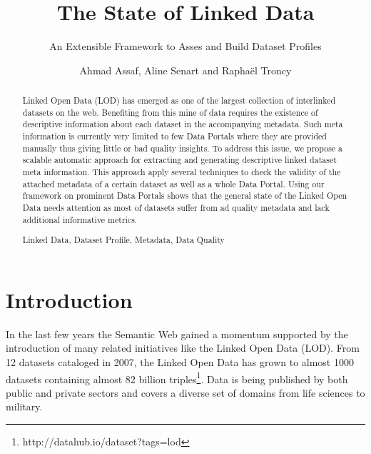 \documentclass[runningheads,a4paper]{llncs}
\newcommand{\keywords}[1]{\par\addvspace\baselineskip
\noindent\keywordname\enspace\ignorespaces#1}
\begin{document}
\title{The State of Linked Data}
\subtitle{An Extensible Framework to Asses and Build Dataset Profiles}

\author{Ahmad Assaf, Aline Senart and Rapha\"{e}l Troncy }



\maketitle


\begin{abstract}
Linked Open Data (LOD) has emerged as one of the largest collection of interlinked datasets on the web. Benefiting from this mine of data requires the existence of descriptive information about each dataset in the accompanying metadata. Such meta information is currently very limited to few Data Portals where they are provided manually thus giving little or bad quality insights. To address this issue, we propose a scalable automatic approach for extracting and generating descriptive linked dataset meta information. This approach apply several techniques to check the validity of the attached metadata of a certain dataset as well as a whole Data Portal. Using our framework on prominent Data Portals shows that the general state of the Linked Open Data needs attention as most of datasets suffer from ad quality metadata and lack additional informative metrics.
\keywords{Linked Data, Dataset Profile, Metadata, Data Quality}
\end{abstract}


\section{Introduction}
\label{sec:introduction}
In the last few years the Semantic Web gained a momentum supported by the introduction of many related initiatives like the Linked Open Data (LOD)\cite{BizerHeath2009}. From 12 datasets cataloged in 2007, the Linked Open Data has grown to almost 1000 datasets containing almost 82 billion triples\footnote{http://datahub.io/dataset?tags=lod}. Data is being published by both public and private sectors and covers a diverse set of domains from life sciences to military.
\end{document}
